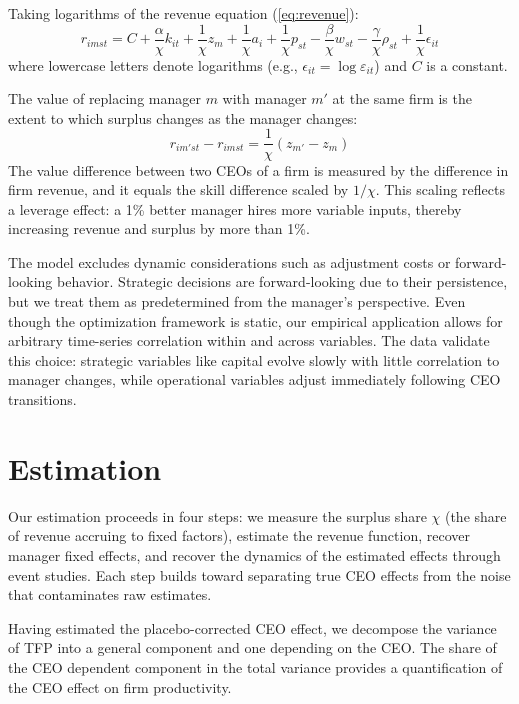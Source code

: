 \documentclass[11pt,a4paper]{article}
\begin{document}
Taking logarithms of the revenue equation (\ref{eq:revenue}):
\begin{equation}\label{eq:log_revenue}
r_{imst} = C+\frac{\alpha}{\chi} k_{it} + \frac{1}{\chi} z_{m} + \frac{1}{\chi} a_i + \frac{1}{\chi} p_{st} - \frac{\beta}{\chi} w_{st} - \frac{\gamma}{\chi} \rho_{st} + \frac{1}{\chi}\epsilon_{it}
\end{equation}
where lowercase letters denote logarithms (e.g., $\epsilon_{it} = \log \varepsilon_{it}$) and $C$ is a constant.

The value of replacing manager $m$ with manager $m'$ at the same firm is the extent to which surplus changes as the manager changes:
\begin{equation}\label{eq:manager_value}
r_{im'st} - r_{imst} = \frac{1}{\chi}(z_{m'} - z_{m})
\end{equation}
The value difference between two CEOs of a firm is measured by the difference in firm revenue, and it equals the skill difference scaled by $1/\chi$. This scaling reflects a leverage effect: a 1\% better manager hires more variable inputs, thereby increasing revenue and surplus by more than 1\%.

The model excludes dynamic considerations such as adjustment costs or forward-looking behavior. Strategic decisions are forward-looking due to their persistence, but we treat them as predetermined from the manager's perspective. Even though the optimization framework is static, our empirical application allows for arbitrary time-series correlation within and across variables. The data validate this choice: strategic variables like capital evolve slowly with little correlation to manager changes, while operational variables adjust immediately following CEO transitions.

\section{Estimation}\label{sec:est}

Our estimation proceeds in four steps: we measure the surplus share $\chi$ (the share of revenue accruing to fixed factors), estimate the revenue function, recover manager fixed effects, and recover the dynamics of the estimated effects through event studies. Each step builds toward separating true CEO effects from the noise that contaminates raw estimates.

Having estimated the placebo-corrected CEO effect, we decompose the variance of TFP into a general component and one depending on the CEO. The share of the CEO dependent component in the total variance provides a quantification of the CEO effect on firm productivity.
\end{document}
